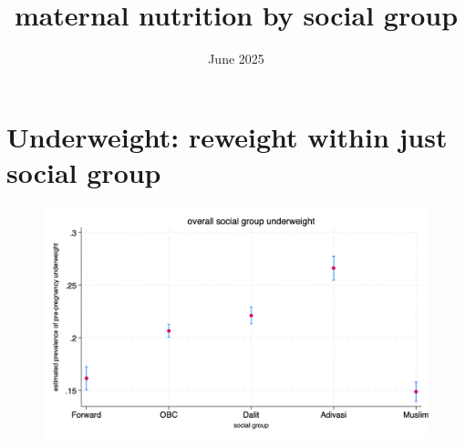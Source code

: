 \documentclass{article}
\title{maternal nutrition by social group}
\date{June 2025}
\begin{document}
\maketitle



\section{Underweight: reweight within \textbf{just social group} }

\begin{figure}[H]
    \centering
    \includegraphics[width=\textwidth]{figures/overall_graph.png}
\end{figure}











\end{document}
